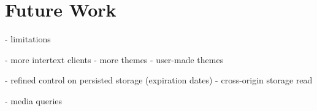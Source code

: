 
\section{Future Work} \label{futureWork}

- limitations

- more intertext clients
- more themes
- user-made themes

- refined control on persisted storage (expiration dates)
- cross-origin storage read

- media queries